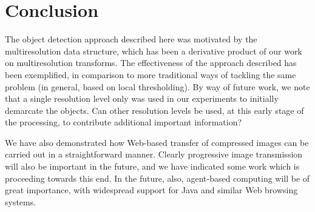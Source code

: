 \section{Conclusion}

The object detection approach described here was motivated by the
multiresolution data structure, which has been a derivative product of our
work on multiresolution transforms.  The effectiveness of the approach 
described has been exemplified, 
in comparison to more traditional ways of tackling
the same problem (in general, based on local thresholding).  By way of future
work, we note that a single resolution level only was used in our 
experiments to initially demarcate the objects.  Can other
resolution levels be used, at this early stage of the processing,
to contribute additional important information?

We have also demonstrated how Web-based transfer of compressed images can be 
carried out in a straightforward manner.  Clearly progressive image 
transmission will also be important in the future, and we have indicated 
some work which is proceeding towards this end.  In the future, also, 
agent-based computing will be of great importance, with widespread support 
for Java and similar Web browsing systems. 



